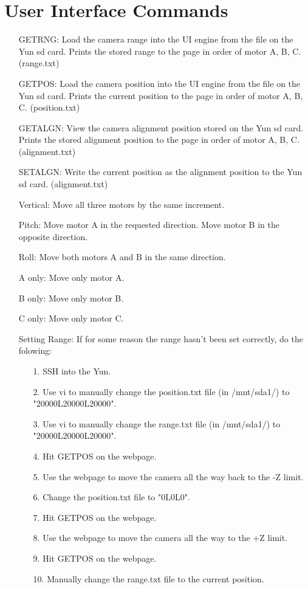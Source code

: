 \documentclass[11pt]{article}
\begin{document}
\section{User Interface Commands}
\begin{enumerate}
	\item[GETRNG:] Load the camera range into the UI engine from the file on the Yun sd card.  Prints the stored range to the page in order of motor A, B, C. (range.txt)
	\item[GETPOS:] Load the camera position into the UI engine from the file on the Yun sd card. Prints the current position to the page in order of motor A, B, C. (position.txt)
	\item[GETALGN:] View the camera alignment position stored on the Yun sd card. Prints the stored alignment position to the page in order of motor A, B, C. (alignment.txt)
	\item[SETALGN:] Write the current position as the alignment position to the Yun sd card. (alignment.txt)
	\item[Vertical:] Move all three motors by the same increment.
	\item[Pitch:] Move motor A in the requested direction. Move motor B in the opposite direction.
	\item[Roll:] Move both motors A and B in the same direction.
	\item[A only:] Move only motor A.
	\item[B only:] Move only motor B.
	\item[C only:] Move only motor C.
	
	\item[Setting Range:] If for some reason the range hasn't been set correctly, do the folowing:
	\begin{enumerate} 
		\item[1.]SSH into the Yun.
		\item[2.]Use vi to manually change the position.txt file (in /mnt/sda1/) to "20000L20000L20000".
		\item[3.]Use vi to manually change the range.txt file (in /mnt/sda1/) to "20000L20000L20000".
		\item[4.]Hit GETPOS on the webpage.
		\item[5.]Use the webpage to move the camera all the way back to the -Z limit.
		\item[6.]Change the position.txt file to "0L0L0".
		\item[7.]Hit GETPOS on the webpage.
		\item[8.]Use the webpage to move the camera all the way to the +Z limit.
		\item[9.]Hit GETPOS on the webpage.
		\item[10.]Manually change the range.txt file to the current position.
	\end{enumerate}
\end{enumerate}
\end{document}
